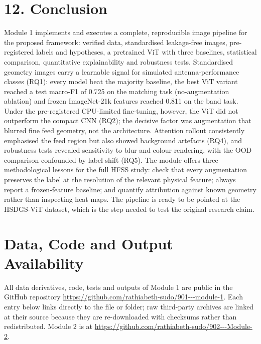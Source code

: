\documentclass[11pt,a4paper]{article}
\begin{document}
\section*{12. Conclusion}
Module 1 implements and executes a complete, reproducible image pipeline for the proposed framework: verified data, standardised leakage-free images, pre-registered labels and hypotheses, a pretrained ViT with three baselines, statistical comparison, quantitative explainability and robustness tests. Standardised geometry images carry a learnable signal for simulated antenna-performance classes (RQ1): every model beat the majority baseline, the best ViT variant reached a test macro-F1 of 0.725 on the matching task (no-augmentation ablation) and frozen ImageNet-21k features reached 0.811 on the band task. Under the pre-registered CPU-limited fine-tuning, however, the ViT did not outperform the compact CNN (RQ2); the decisive factor was augmentation that blurred fine feed geometry, not the architecture. Attention rollout consistently emphasised the feed region but also showed background artefacts (RQ4), and robustness tests revealed sensitivity to blur and colour rendering, with the OOD comparison confounded by label shift (RQ5). The module offers three methodological lessons for the full HFSS study: check that every augmentation preserves the label at the resolution of the relevant physical feature; always report a frozen-feature baseline; and quantify attribution against known geometry rather than inspecting heat maps. The pipeline is ready to be pointed at the HSDGS-ViT dataset, which is the step needed to test the original research claim.

\section*{Data, Code and Output Availability}
All data derivatives, code, tests and outputs of Module 1 are public in the GitHub repository \url{https://github.com/rathiabeth-sudo/901---module-1}. Each entry below links directly to the file or folder; raw third-party archives are linked at their source because they are re-downloaded with checksums rather than redistributed. Module 2 is at \url{https://github.com/rathiabeth-sudo/902---Module-2}.
\end{document}
